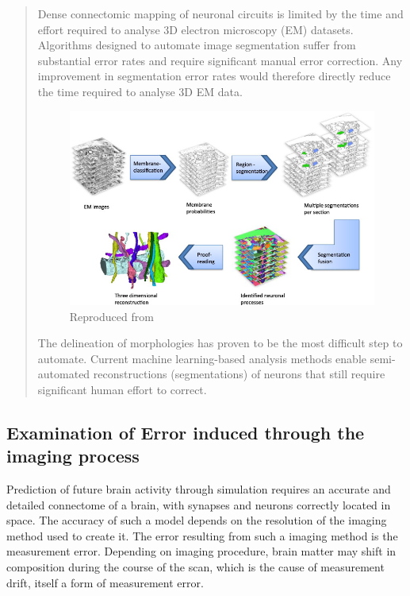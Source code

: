 \begin{quote}
    Dense connectomic mapping of neuronal circuits is limited by the time and
    effort required to analyse 3D electron microscopy (EM) datasets. Algorithms
    designed to automate image segmentation suffer from substantial error rates
    and require significant manual error correction. Any improvement in
    segmentation error rates would therefore directly reduce the time required
    to analyse 3D EM data.
    \autocite{pallotto_extracellular_2015} 

    \begin{figure}[h]
        \centering
        \includegraphics[scale=0.75]{figures/images/reconstruction.jpg}
        {Reproduced from \cite{kaynig_large-scale_2015}}
        \label{reconstruction}
    \end{figure}
    \vspace{1ex}

    The delineation of morphologies has proven to be the most difficult step to
    automate. Current machine learning-based analysis methods enable
    semi-automated reconstructions (segmentations) of neurons that still require
    significant human effort to correct.
    \autocite{helmstaedter_connectomic_2013}
\end{quote}

\subsection[Error induced through noise]{Examination of Error induced through the imaging process}

Prediction of future brain activity through simulation requires an accurate and
detailed connectome of a brain, with synapses and neurons correctly located in
space.\autocite{bostrom_whole_2008} The accuracy of such a model depends on the
resolution of the imaging method used to create it. The error resulting from
such a imaging method is the measurement error. Depending on imaging procedure, brain matter may shift in composition during the course of the scan, which is the cause of measurement drift, itself a form of measurement error.




